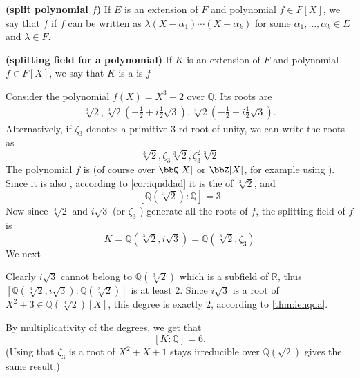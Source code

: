 \documentclass{article}
\newcommand{\bfs}[1]{\textbf{({#1}) }}
\begin{document}
\begin{defa}\bfs{split polynomial $f$}
 If $E$ is an extension of $F$ and polynomial $f \in F[X]$, we say that $f$  if $f$ can be written as $\lambda\left(X-\alpha_{1}\right) \cdots\left(X-\alpha_{k}\right)$ for some $\alpha_{1}, \ldots, \alpha_{k} \in E$ and $\lambda \in F$.
\end{defa}
\begin{defa}\bfs{splitting field for a polynomial}\label{def:dqdadc}
 If $K$ is an extension of $F$ and polynomial $f \in F[X]$, we say that $K$ is a  is $f$ 
\end{defa}
\begin{exma}\label{ex:oqmdadc}
Consider the polynomial $f(X)=X^{3}-2$ over $\mathbb{Q}$. Its roots are
\begin{align*}
\sqrt[3]{2}, \sqrt[3]{2}\left(-\frac{1}{2}+i \frac{1}{2} \sqrt{3}\right), \sqrt[3]{2}\left(-\frac{1}{2}-i \frac{1}{2} \sqrt{3}\right) .
\end{align*}
Alternatively, if $\zeta_{3}$ denotes a primitive 3-rd root of unity, we can write the roots as
$$
\sqrt[3]{2}, \zeta_{3} \sqrt[3]{2}, \zeta_{3}^{2} \sqrt[3]{2}
$$
The polynomial $f$ is  (of course over $\bbQ[X]$ or $\bbZ[X]$, for example using ). Since it is also , according to \cref{cor:iqnddad} it is the  of $\sqrt[3]{2}$, and
$$
[\mathbb{Q}(\sqrt[3]{2}): \mathbb{Q}]=3
$$
Now since $\sqrt[3]{2}$ and $i \sqrt{3}$ (or $\zeta_{3}$ ) generate all the roots of $f$, the splitting field of $f$ is
$$
K=\mathbb{Q}(\sqrt[3]{2}, i \sqrt{3})=\mathbb{Q}\left(\sqrt[3]{2}, \zeta_{3}\right)
$$
We next 

Clearly $i \sqrt{3}$ cannot belong to $\mathbb{Q}(\sqrt[3]{2})$ which is a subfield of $\mathbb{R}$, thus $[\mathbb{Q}(\sqrt[3]{2}, i \sqrt{3}): \mathbb{Q}(\sqrt[3]{2})]$ is at least 2. Since $i \sqrt{3}$ is a root of $X^{2}+3 \in \mathbb{Q}(\sqrt[3]{2})[X]$, this degree is exactly 2, according to \cref{thm:ienqda}.

By multiplicativity of the degrees, we get that
$$
[K: \mathbb{Q}]=6 .
$$
(Using that $\zeta_{3}$ is a root of $X^{2}+X+1$ stays irreducible over $\mathbb{Q}(\sqrt{2})$ gives the same result.)
\end{exma}
\end{document}
